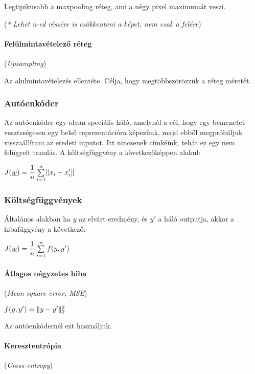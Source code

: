 Legtipikusabb a maxpooling réteg, ami a négy pixel maximumát veszi.

(\textit{* Lehet n-ed részére is csökkenteni a képet, nem csak a felére})

\paragraph{Felülmintavételező réteg} (\textit{Upsampling})

Az alulmintavételezés ellentéte. Célja, hogy megtöbbszörözzük a réteg
méretét.




\subsubsection{Autóenkóder}

Az autóenkóder egy olyan speciális háló, amelynél a cél, hogy 
egy bemenetet veszteségesen egy belső reprezentációra képezünk,
majd ebből megpróbáljuk visszaállítani az eredeti inputot.
Itt nincsenek címkéink, tehát ez egy nem felügyelt tanulás.
A költségfüggvény a következőképpen alakul:


$ J(\underline{w}) = \dfrac{1}{n} \sum\limits_{{i}=1}^{n}\lVert x_i - x_i'\rVert $




\subsubsection{Költségfüggvények}

Általános alakban ha $ y $ az elvárt eredmény, és $ y' $ a háló
outputja, akkor a hibafüggvény a következő:

$ J(\underline{w}) = \dfrac{1}{n} \sum\limits_{{i}=1}^{n} f(y, y') $


\paragraph{Átlagos négyzetes hiba} (\textit{Mean square error, MSE})


$ f(y, y') = \lVert y - y'\rVert_2^2 $

\noindent
Az autóenkódernél ezt használjuk.


\paragraph{Keresztentrópia} (\textit{Cross-entropy})

